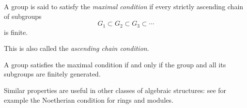 \documentclass[12pt]{article}
\begin{document}
A group is said to satisfy the \emph{maximal condition} if every strictly ascending chain of subgroups
$$G_1 \subset G_2 \subset G_3 \subset \cdots$$
is finite.

This is also called the \emph{ascending chain condition}.

A group satisfies the maximal condition if and only if the group and all its subgroups are finitely generated.

Similar properties are useful in other classes of algebraic structures: see for example the Noetherian condition for rings and modules.
\end{document}
